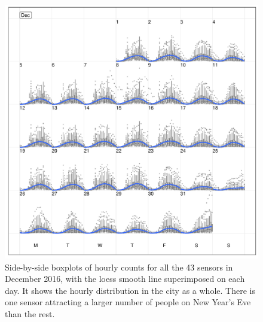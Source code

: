 \documentclass[12pt]{article}
\begin{document}
\begin{figure}

{\centering \includegraphics[width=\textwidth]{figure/boxplot-1} 

}

\caption{Side-by-side boxplots of hourly counts for all the 43 sensors in December 2016, with the loess smooth line superimposed on each day. It shows the hourly distribution in the city as a whole. There is one sensor attracting a larger number of people on New Year's Eve than the rest.}\label{fig:boxplot}
\end{figure}
\end{document}
